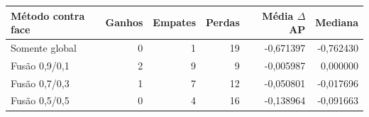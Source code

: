 \begin{tabular}{lrrrrr}
\toprule
Método contra face & Ganhos & Empates & Perdas & Média $\Delta$AP & Mediana \\
\midrule
Somente global & 0 & 1 & 19 & -0,671397 & -0,762430 \\
Fusão 0,9/0,1 & 2 & 9 & 9 & -0,005987 & 0,000000 \\
Fusão 0,7/0,3 & 1 & 7 & 12 & -0,050801 & -0,017696 \\
Fusão 0,5/0,5 & 0 & 4 & 16 & -0,138964 & -0,091663 \\
\bottomrule
\end{tabular}
